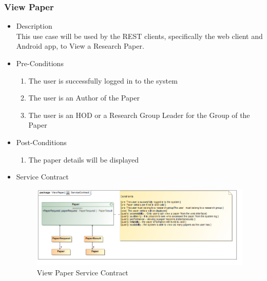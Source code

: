 \documentclass[a4paper,10pt]{article}
\begin{document}
\subsubsection{View Paper}
	\begin{itemize}
		\item Description\\
			This use case will be used by the REST clients, specifically the web client and Android app, to View a Research Paper.
		\item Pre-Conditions
			\begin{enumerate}
				\item The user is successfully logged in to the system
				\item The user is an Author of the Paper
				\item The user is an HOD or a Research Group Leader for the Group of the Paper
			\end{enumerate}
		\item Post-Conditions
			\begin{enumerate}
				\item The paper details will be displayed
						
			\end{enumerate}
		\item Service Contract
			\begin{figure}[H]
				\includegraphics[scale=0.5]{ViewPaperServiceContract}
				\caption{View Paper Service Contract}
			\end{figure}

	\end{itemize}
\end{document}
